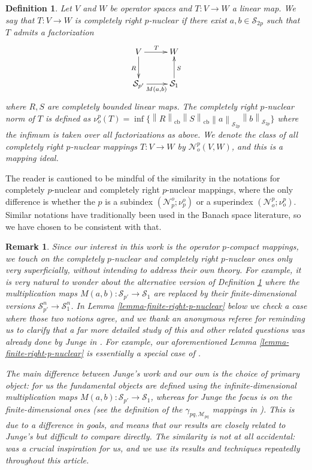 \documentclass[11pt]{amsart}
\DeclareMathOperator{\cb}{cb}
\newcommand{\n}[1]{ \left\|#1\right\| }
\newtheorem{definition}[theorem]{Definition}
\newtheorem{remark}[theorem]{Remark}
\numberwithin{equation}{section}
\begin{document}
\begin{definition}\label{defn-comp-right-p-nuclear}
Let $V$ and $W$ be operator spaces and $T : V \to W$ a linear map.
We say that $T : V \to W$ is \emph{completely right $p$-nuclear} if there exist $a,b \in \mathcal{S}_{2p}$ such that $T$  admits a factorization
$$
\xymatrix{
V \ar[r]^T \ar[d]_{R} &W \\
\mathcal{S}_{p'} \ar[r]_{M(a,b)} &\mathcal{S}_1 \ar[u]_{S}
}
$$
where $R,S$ are completely bounded linear maps.
The completely right $p$-nuclear norm of $T$ is defined as
$
\nu^p_o(T) = \inf \big\{ \n{R}_{\cb} \n{S}_{\cb}  \n{a}_{\mathcal{S}_{2p}} \n{b}_{\mathcal{S}_{2p}}  \big\}
$
where the infimum is taken over all factorizations as above.
We denote the class of all completely right $p$-nuclear mappings $T:V \to W$ by $\mathcal N^p_o(V,W)$,  and this is a mapping ideal.
\end{definition}


The reader is cautioned to be mindful of the similarity in the notations for completely $p$-nuclear and completely right $p$-nuclear mappings, where the only difference is whether the $p$ is a subindex $(\mathcal N_p^o; \nu_p^o)$ or a superindex $(\mathcal N^p_o; \nu^p_o)$. Similar notations have traditionally been used in the Banach space literature, so we have chosen to be consistent with that.


\begin{remark}
Since our interest in this work is the operator $p$-compact mappings, we touch on the completely $p$-nuclear and completely right $p$-nuclear ones only very superficially, without intending to address their own theory. For example, it is very natural to wonder about the alternative version of Definition \ref{defn-comp-right-p-nuclear} where the multiplication maps $M(a,b) : \mathcal{S}_{p'} \to \mathcal{S}_1$ are replaced by their finite-dimensional versions $\mathcal{S}^n_{p'} \to \mathcal{S}^n_1$. 
In Lemma \ref{lemma-finite-right-p-nuclear} below we check a case where those two notions agree, 
and we thank an anonymous referee for reminding us to clarify that a far more detailed study of this and other related questions was already done by Junge in \cite[Sec. 3.1]{Junge-Habilitationschrift}.
For example, our aforementioned Lemma \ref{lemma-finite-right-p-nuclear} is essentially a special case of \cite[Cor. 3.1.4.5]{Junge-Habilitationschrift}.

The main difference between Junge's work and our own is the choice of primary object: for us the fundamental objects are defined using the infinite-dimensional multiplication maps $M(a,b) : \mathcal{S}_{p'} \to \mathcal{S}_1$, whereas for Junge the focus is on the finite-dimensional ones (see the definition of the $\gamma_{pq,\mathcal{M}_{pq}}$ mappings in \cite[Sec. 3.1.4]{Junge-Habilitationschrift}). This is due to a difference in goals, and means that our results are closely related to Junge's but difficult to compare directly. The similarity is not at all accidental: \cite{Junge-Habilitationschrift} was a crucial inspiration for us, and we use its results and techniques repeatedly throughout this article.
\end{remark}
\end{document}
